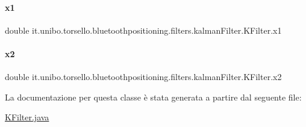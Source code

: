\paragraph{\texorpdfstring{x1}{x1}}
{\footnotesize\ttfamily double it.\+unibo.\+torsello.\+bluetoothpositioning.\+filters.\+kalman\+Filter.\+K\+Filter.\+x1\hspace{0.3cm}{\ttfamily [private]}}

\hypertarget{classit_1_1unibo_1_1torsello_1_1bluetoothpositioning_1_1filters_1_1kalmanFilter_1_1KFilter_a47a49df3a17886229a33cf468029b477_a47a49df3a17886229a33cf468029b477}{}\label{classit_1_1unibo_1_1torsello_1_1bluetoothpositioning_1_1filters_1_1kalmanFilter_1_1KFilter_a47a49df3a17886229a33cf468029b477_a47a49df3a17886229a33cf468029b477} 
\paragraph{\texorpdfstring{x2}{x2}}
{\footnotesize\ttfamily double it.\+unibo.\+torsello.\+bluetoothpositioning.\+filters.\+kalman\+Filter.\+K\+Filter.\+x2\hspace{0.3cm}{\ttfamily [private]}}



La documentazione per questa classe è stata generata a partire dal seguente file\+:\begin{DoxyCompactItemize}
\item 
\hyperlink{KFilter_8java}{K\+Filter.\+java}\end{DoxyCompactItemize}
